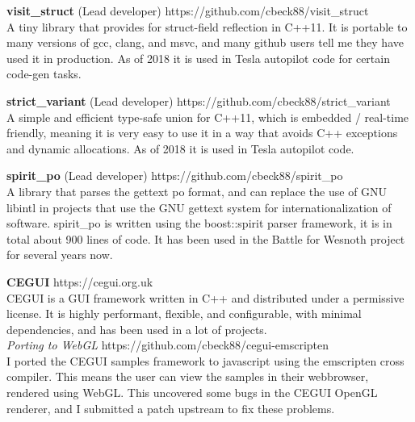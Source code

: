 \documentclass[margin,line]{resume}
\begin{document}
\begin{resume}
    \textbf{visit\_struct} (Lead developer) \hfill https://github.com/cbeck88/visit\_struct \\
    A tiny library that provides for struct-field reflection in C++11. It is portable to many versions of gcc, clang, and msvc,
    and many github users tell me they have used it in production. As of 2018 it is used in Tesla autopilot code for certain code-gen tasks.

    \textbf{strict\_variant} (Lead developer) \hfill https://github.com/cbeck88/strict\_variant \\
    A simple and efficient type-safe union for C++11, which is embedded / real-time friendly, meaning it is very easy
    to use it in a way that avoids C++ exceptions and dynamic allocations. As of 2018 it is used in Tesla autopilot code.

    \textbf{spirit\_po} (Lead developer) \hfill https://github.com/cbeck88/spirit\_po \\
    A library that parses the gettext po format, and can replace the use of GNU libintl in projects that use the GNU
    gettext system for internationalization of software.
    spirit\_po is written using the boost::spirit parser framework, it is in total about 900 lines of code.
    It has been used in the Battle for Wesnoth project for several years now.

    \textbf{CEGUI} \hfill https://cegui.org.uk  \\
    CEGUI is a GUI framework written in C++ and distributed under a permissive license. It is highly performant,
    flexible, and configurable, with minimal dependencies, and has been used in a lot of projects. \\
    \textsl{Porting to WebGL} \hfill https://github.com/cbeck88/cegui-emscripten \\
    I ported the CEGUI samples framework to javascript using the emscripten cross compiler.
    This means the user can view the samples in their webbrowser, rendered using WebGL. This uncovered some
    bugs in the CEGUI OpenGL renderer, and I submitted a patch upstream to fix these problems. \\


\end{resume}
\end{document}

